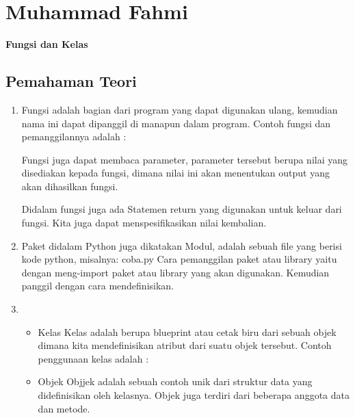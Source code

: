 
\section{Muhammad Fahmi}
\textbf{{\large Fungsi dan Kelas}}

\subsection{Pemahaman Teori}
\begin{enumerate}
	\item Fungsi adalah bagian dari program yang dapat digunakan ulang, kemudian nama ini dapat dipanggil di manapun dalam program.
	Contoh fungsi dan pemanggilannya adalah :
	
	Fungsi juga dapat membaca parameter, parameter tersebut berupa nilai yang disediakan kepada fungsi, dimana nilai ini akan menentukan output yang akan dihasilkan fungsi.
	
	Didalam fungsi juga ada Statemen return yang digunakan untuk keluar dari fungsi. Kita juga dapat menspesifikasikan nilai kembalian.
	
	
	\item Paket didalam Python juga dikatakan Modul,  adalah sebuah file yang berisi kode python, misalnya: coba.py
	Cara pemanggilan paket atau library yaitu dengan meng-import paket atau library yang akan digunakan. Kemudian panggil dengan cara mendefinisikan.
	
	
	\item \begin{itemize}
		\item Kelas
		Kelas adalah berupa blueprint atau cetak biru dari sebuah objek dimana kita mendefinisikan atribut dari suatu objek tersebut.
		Contoh penggunaan kelas adalah :
		
		
		\item Objek
		Objjek adalah sebuah contoh unik dari struktur data yang didefinisikan oleh kelasnya. Objek juga terdiri dari beberapa anggota data dan metode.
		
		

\end{itemize}
\end{enumerate}
